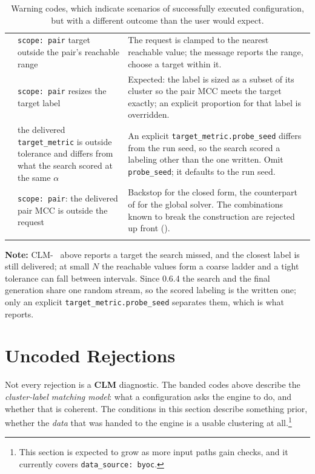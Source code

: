 \documentclass[a4paper,11pt]{article}
\newcommand{\vcode}[1]{\textcolor{valred}{\bfseries\ttfamily #1}}
\newcommand{\wcode}[1]{\textcolor{warnamber}{\bfseries\ttfamily #1}}
\begin{document}
\begin{longtable}{@{}L{1.0cm} L{5.2cm} L{8.8cm}@{}}
\wcode{307} & \texttt{scope: pair} target outside the pair's reachable range & The request is clamped to the nearest reachable value; the message reports the range, choose a target within it. \\
\wcode{308} & \texttt{scope: pair} resizes the target label & Expected: the label is sized as a subset of its cluster so the pair MCC meets the target exactly; an explicit proportion for that label is overridden. \\
\wcode{309} & the delivered \texttt{target\_metric} is outside tolerance and differs from what the search scored at the same $\alpha$ & An explicit \texttt{target\_metric.probe\_seed} differs from the run seed, so the search scored a labeling other than the one written. Omit \texttt{probe\_seed}; it defaults to the run seed. \\
\wcode{310} & \texttt{scope: pair}: the delivered pair MCC is outside the request & Backstop for the closed form, the counterpart of \wcode{306} for the global solver. The combinations known to break the construction are rejected up front (\vcode{130}). \\
\bottomrule
\caption{Warning codes, which indicate scenarios of successfully executed configuration, but with a different outcome than the user would expect.}
\label{warnings}
\end{longtable}

\noindent \textbf{Note:} CLM-~\wcode{306} above reports a target the search missed, and the closest label is still delivered; at small $N$ the reachable values form a coarse ladder and a tight tolerance can fall between intervals. Since 0.6.4 the search and the final generation share one random stream, so the scored labeling is the written one; only an explicit \texttt{target\_metric.probe\_seed} separates them, which is what \wcode{309} reports.

\newpage

\section{Uncoded Rejections}

\noindent Not every rejection is a \vcode{CLM} diagnostic. The banded codes above describe the \emph{cluster-label matching model}: what a configuration asks the engine to do, and whether that is coherent. The conditions in this section describe something prior, whether the \emph{data} that was handed to the engine is a usable clustering at all.\footnote{This section is expected to grow as more input paths gain checks, and it currently covers \texttt{data\_source:~byoc}.}
\end{document}
